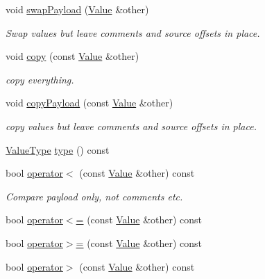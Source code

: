 \begin{DoxyCompactItemize}
void \hyperlink{classJson_1_1Value_a5263476047f20e2fc6de470e4de34fe5_a5263476047f20e2fc6de470e4de34fe5}{swap\+Payload} (\hyperlink{classJson_1_1Value}{Value} \&other)
\begin{DoxyCompactList}\small\item\em Swap values but leave comments and source offsets in place. \end{DoxyCompactList}\item 
void \hyperlink{classJson_1_1Value_a1b2c6379664d91b9f1bcd4d1853e5970_a1b2c6379664d91b9f1bcd4d1853e5970}{copy} (const \hyperlink{classJson_1_1Value}{Value} \&other)
\begin{DoxyCompactList}\small\item\em copy everything. \end{DoxyCompactList}\item 
void \hyperlink{classJson_1_1Value_ab504d299cfaa440392037fa8a3c54064_ab504d299cfaa440392037fa8a3c54064}{copy\+Payload} (const \hyperlink{classJson_1_1Value}{Value} \&other)
\begin{DoxyCompactList}\small\item\em copy values but leave comments and source offsets in place. \end{DoxyCompactList}\item 
\hyperlink{namespaceJson_a7d654b75c16a57007925868e38212b4e_a7d654b75c16a57007925868e38212b4e}{Value\+Type} \hyperlink{classJson_1_1Value_a8ce61157a011894f0252ceed232312de_a8ce61157a011894f0252ceed232312de}{type} () const
\item 
bool \hyperlink{classJson_1_1Value_aac6bd14155b88ed2d39ef54820b39e49_aac6bd14155b88ed2d39ef54820b39e49}{operator$<$} (const \hyperlink{classJson_1_1Value}{Value} \&other) const
\begin{DoxyCompactList}\small\item\em Compare payload only, not comments etc. \end{DoxyCompactList}\item 
bool \hyperlink{classJson_1_1Value_a40c411a320a416d5eac0052b36211286_a40c411a320a416d5eac0052b36211286}{operator$<$=} (const \hyperlink{classJson_1_1Value}{Value} \&other) const
\item 
bool \hyperlink{classJson_1_1Value_afe2c3e52df60b9622cbd8358b74bdbf5_afe2c3e52df60b9622cbd8358b74bdbf5}{operator$>$=} (const \hyperlink{classJson_1_1Value}{Value} \&other) const
\item 
bool \hyperlink{classJson_1_1Value_a4646c2f0764908c0972160c7c2ebe567_a4646c2f0764908c0972160c7c2ebe567}{operator$>$} (const \hyperlink{classJson_1_1Value}{Value} \&other) const

\end{DoxyCompactItemize}
